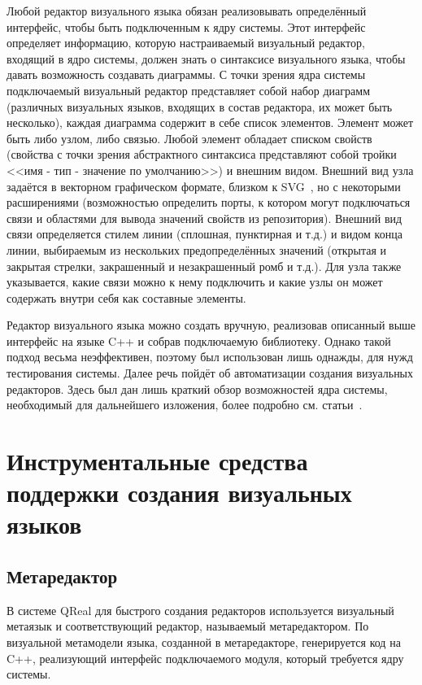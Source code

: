 Любой редактор визуального языка обязан реализовывать определённый интерфейс, чтобы 
быть подключенным к ядру системы. Этот интерфейс определяет информацию, которую настраиваемый 
визуальный редактор, входящий в ядро системы, должен знать о синтаксисе визуального 
языка, чтобы давать возможность создавать диаграммы. С точки зрения ядра системы подключаемый 
визуальный редактор представляет собой набор диаграмм (различных визуальных языков, 
входящих в состав редактора, их может быть несколько), каждая диаграмма содержит в 
себе список элементов. Элемент может быть либо узлом, либо связью. Любой элемент обладает 
списком свойств (свойства с точки зрения абстрактного синтаксиса представляют собой 
тройки <<имя - тип - значение по умолчанию>>) и внешним видом. Внешний вид узла задаётся в 
векторном графическом формате, близком к SVG~\cite{svg}, но с некоторыми расширениями 
(возможностью определить порты, к котором могут подключаться связи и областями для вывода значений 
свойств из репозитория). Внешний вид связи определяется стилем линии (сплошная, пунктирная 
и т.д.) и видом конца линии, выбираемым из нескольких предопределённых значений (открытая 
и закрытая стрелки, закрашенный и незакрашенный ромб и т.д.). Для узла также указывается, 
какие связи можно к нему подключить и какие узлы он может содержать внутри себя как 
составные элементы.

Редактор визуального языка можно создать вручную, реализовав описанный выше интерфейс 
на языке C++ и собрав подключаемую библиотеку. Однако такой подход весьма неэффективен, 
поэтому был использован лишь однажды, для нужд тестирования системы. Далее речь пойдёт 
об автоматизации создания визуальных редакторов. Здесь был дан лишь краткий обзор 
возможностей ядра системы, необходимый для дальнейшего изложения, более подробно 
см. статьи~\cite{terekhov2009architecture, kuzenkova2011qreal, kuzenkova2013qreal}.

\section{Инструментальные средства поддержки создания визуальных языков}

\subsection{Метаредактор}
В системе QReal для быстрого создания редакторов используется визуальный метаязык и 
соответствующий редактор, называемый метаредактором. По визуальной метамодели языка, 
созданной в метаредакторе, генерируется код на C++, реализующий интерфейс подключаемого 
модуля, который требуется ядру системы.

